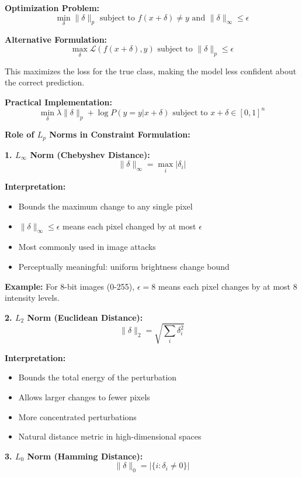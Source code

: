 \documentclass[12pt]{article}
\begin{document}
\begin{enumerate}[(a)]
{    \textbf{Optimization Problem:}
    $$\min_{\delta} \|\delta\|_p \text{ subject to } f(x + \delta) \neq y \text{ and } \|\delta\|_\infty \leq \epsilon$$
    
    \textbf{Alternative Formulation:}
    $$\max_{\delta} \mathcal{L}(f(x + \delta), y) \text{ subject to } \|\delta\|_p \leq \epsilon$$
    
    This maximizes the loss for the true class, making the model less confident about the correct prediction.
    
    \textbf{Practical Implementation:}
    $$\min_{\delta} \lambda \|\delta\|_p + \log P(y = y | x + \delta) \text{ subject to } x + \delta \in [0,1]^n$$
    
    \textbf{Role of $L_p$ Norms in Constraint Formulation:}
    
    \textbf{1. $L_\infty$ Norm (Chebyshev Distance):}
    $$\|\delta\|_\infty = \max_i |\delta_i|$$
    
    \textbf{Interpretation:}
    \begin{itemize}
        \item Bounds the maximum change to any single pixel
        \item $\|\delta\|_\infty \leq \epsilon$ means each pixel changed by at most $\epsilon$
        \item Most commonly used in image attacks
        \item Perceptually meaningful: uniform brightness change bound
    \end{itemize}
    
    \textbf{Example:} For 8-bit images (0-255), $\epsilon = 8$ means each pixel changes by at most 8 intensity levels.
    
    \textbf{2. $L_2$ Norm (Euclidean Distance):}
    $$\|\delta\|_2 = \sqrt{\sum_i \delta_i^2}$$
    
    \textbf{Interpretation:}
    \begin{itemize}
        \item Bounds the total energy of the perturbation
        \item Allows larger changes to fewer pixels
        \item More concentrated perturbations
        \item Natural distance metric in high-dimensional spaces
    \end{itemize}
    
    \textbf{3. $L_0$ Norm (Hamming Distance):}
    $$\|\delta\|_0 = |\{i : \delta_i \neq 0\}|$$
    
}
\end{enumerate}
\end{document}
